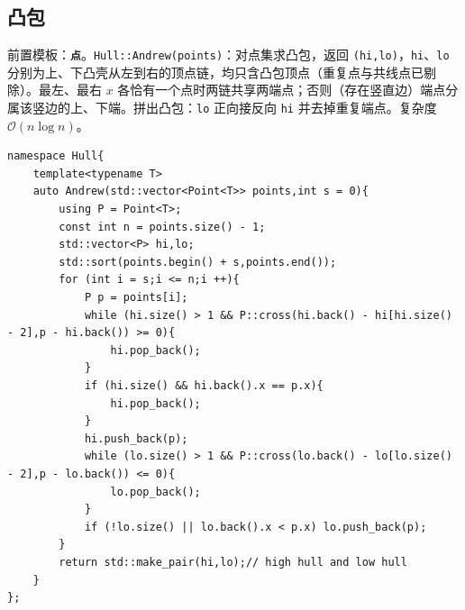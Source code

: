 \subsection{凸包}

前置模板：\textbf{\texttt{点}}。\verb|Hull::Andrew(points)|：对点集求凸包，返回 \texttt{(hi,lo)}，\texttt{hi}、\texttt{lo} 分别为上、下凸壳从左到右的顶点链，均只含凸包顶点（重复点与共线点已剔除）。最左、最右 $x$ 各恰有一个点时两链共享两端点；否则（存在竖直边）端点分属该竖边的上、下端。拼出凸包：\texttt{lo} 正向接反向 \texttt{hi} 并去掉重复端点。复杂度 $\mathcal{O}(n\log n)$。

\begin{lstlisting}
namespace Hull{
    template<typename T>
    auto Andrew(std::vector<Point<T>> points,int s = 0){
        using P = Point<T>;
        const int n = points.size() - 1;
        std::vector<P> hi,lo;
        std::sort(points.begin() + s,points.end());
        for (int i = s;i <= n;i ++){
            P p = points[i];
            while (hi.size() > 1 && P::cross(hi.back() - hi[hi.size() - 2],p - hi.back()) >= 0){
                hi.pop_back();
            }
            if (hi.size() && hi.back().x == p.x){
                hi.pop_back();
            }
            hi.push_back(p);
            while (lo.size() > 1 && P::cross(lo.back() - lo[lo.size() - 2],p - lo.back()) <= 0){
                lo.pop_back();
            }
            if (!lo.size() || lo.back().x < p.x) lo.push_back(p);
        }
        return std::make_pair(hi,lo);// high hull and low hull
    }
};
\end{lstlisting}